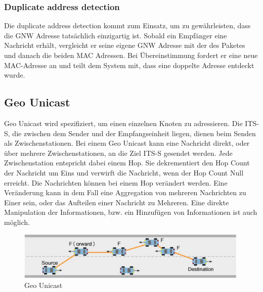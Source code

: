 \subsubsection{Duplicate address detection}
Die duplicate address detection kommt zum Einsatz, um zu gewährleisten, dass die \acl{GNW} Adresse tatsächlich einzigartig ist. Sobald ein Empfänger eine Nachricht erhält, vergleicht er seine eigene \acl{GNW} Adresse mit der des Paketes und danach die beiden MAC Adressen. Bei Übereinstimmung fordert er eine neue MAC-Adresse an und teilt dem System mit, dass eine doppelte Adresse entdeckt wurde. \cite{etsi302636-4-1}

\subsection{Geo Unicast}
Geo Unicast wird spezifiziert, um einen einzelnen Knoten zu adressieren. Die \ac{ITS-S}, die zwischen dem Sender und der Empfangseinheit liegen, dienen beim Senden als Zwischenstationen. Bei einem Geo Unicast kann eine Nachricht direkt, oder über mehrere Zwischenstationen, an die Ziel \ac{ITS-S} gesendet werden. Jede Zwischenstation entspricht dabei einem Hop. Sie dekrementiert den Hop Count der Nachricht um Eins und verwirft die Nachricht, wenn der Hop Count Null erreicht. Die Nachrichten können bei einem Hop verändert werden. Eine Veränderung kann in dem Fall eine Aggregation von mehreren Nachrichten zu Einer sein, oder das Aufteilen einer Nachricht zu Mehreren. Eine direkte Manipulation der Informationen, bzw. ein Hinzufügen von Informationen ist auch möglich.


\begin{figure}[H]
	\includegraphics[width=0.99\textwidth]{content/images/03_networklayer/GeoUnicast.png}
	\caption{Geo Unicast \cite{etsi102636-1}}
	\label{fig:geounicast}
\end{figure}


